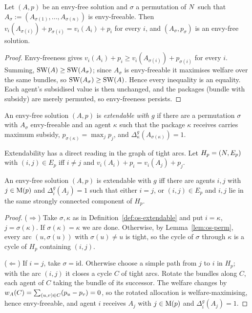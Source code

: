 \begin{lemma}
\label{lem:os-perm}
Let $(A,p)$ be an envy-free solution and $\sigma$ a permutation of $N$
such that $A_\sigma:=(A_{\sigma(1)},\dots,A_{\sigma(n)})$ is envy-freeable. Then
$v_i(A_{\sigma(i)})+p_{\sigma(i)}=v_i(A_i)+p_i$ for every $i$, and
$(A_\sigma,p_\sigma)$ is an envy-free solution.
\end{lemma}

\begin{proof}
Envy-freeness gives $v_i(A_i)+p_i\ge v_i(A_{\sigma(i)})+p_{\sigma(i)}$ for
every $i$. Summing, $\mathrm{SW}(A)\ge\mathrm{SW}(A_\sigma)$; since $A_\sigma$ is envy-freeable
it maximises welfare over the same bundles, so $\mathrm{SW}(A_\sigma)\ge\mathrm{SW}(A)$. Hence
every inequality is an equality. Each agent's subsidised value is then
unchanged, and the packages (bundle with subsidy) are merely permuted, so
envy-freeness persists.
\end{proof}

\begin{definition}[Extendable]
\label{def:os-extendable}
An envy-free solution $(A,p)$ is \emph{extendable with $g$} if there are a
permutation $\sigma$ with $A_\sigma$ envy-freeable and an agent $\kappa$ such
that the package $\kappa$ receives carries maximum subsidy,
$p_{\sigma(\kappa)}=\max_j p_j$, and $\Delta_\kappa^g(A_{\sigma(\kappa)})=1$.
\end{definition}

Extendability has a direct reading in the graph of tight arcs. Let
$H_p=(N,E_p)$ with $(i,j)\in E_p$ iff $i\ne j$ and
$v_i(A_i)+p_i=v_i(A_j)+p_j$.

\begin{proposition}
\label{prop:os-extendable-graph}
An envy-free solution $(A,p)$ is extendable with $g$ iff there are agents
$i,j$ with $j\in\mathrm{M}(p)$ and $\Delta_i^g(A_j)=1$ such that either $i=j$, or
$(i,j)\in E_p$ and $i,j$ lie in the same strongly connected component of $H_p$.
\end{proposition}

\begin{proof}
($\Rightarrow$) Take $\sigma,\kappa$ as in Definition~\ref{def:os-extendable}
and put $i=\kappa$, $j=\sigma(\kappa)$. If $\sigma(\kappa)=\kappa$ we are done.
Otherwise, by Lemma~\ref{lem:os-perm}, every arc $(u,\sigma(u))$ with
$\sigma(u)\ne u$ is tight, so the cycle of $\sigma$ through $\kappa$ is a cycle
of $H_p$ containing $(i,j)$.

($\Leftarrow$) If $i=j$, take $\sigma=\mathrm{id}$. Otherwise choose a simple
path from $j$ to $i$ in $H_p$; with the arc $(i,j)$ it closes a cycle $C$ of
tight arcs. Rotate the bundles along $C$, each agent of $C$ taking the bundle
of its successor. The welfare changes by $w_{A}(C)=\sum_{(u,v)\in C}(p_u-p_v)=0$,
so the rotated allocation is welfare-maximising, hence envy-freeable, and
agent $i$ receives $A_j$ with $j\in\mathrm{M}(p)$ and $\Delta_i^g(A_j)=1$.
\end{proof}

